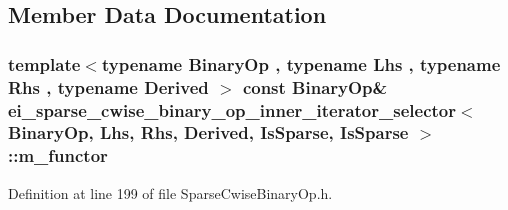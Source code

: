 \subsection{Member Data Documentation}
\hypertarget{classei__sparse__cwise__binary__op__inner__iterator__selector_3_01_binary_op_00_01_lhs_00_01_rhs41884b18ee8e06a3d784c3c098ec6b91_a77e68428923946cf9249aa8cd2b4034d}{
\subsubsection[{m\-\_\-functor}]{\setlength{\rightskip}{0pt plus 5cm}template$<$typename Binary\-Op , typename Lhs , typename Rhs , typename Derived $>$ const Binary\-Op\& {\bf ei\-\_\-sparse\-\_\-cwise\-\_\-binary\-\_\-op\-\_\-inner\-\_\-iterator\-\_\-selector}$<$ Binary\-Op, Lhs, Rhs, Derived, {\bf Is\-Sparse}, {\bf Is\-Sparse} $>$\-::m\-\_\-functor\hspace{0.3cm}{\ttfamily [protected]}}}\label{classei__sparse__cwise__binary__op__inner__iterator__selector_3_01_binary_op_00_01_lhs_00_01_rhs41884b18ee8e06a3d784c3c098ec6b91_a77e68428923946cf9249aa8cd2b4034d}


Definition at line 199 of file Sparse\-Cwise\-Binary\-Op.\-h.


